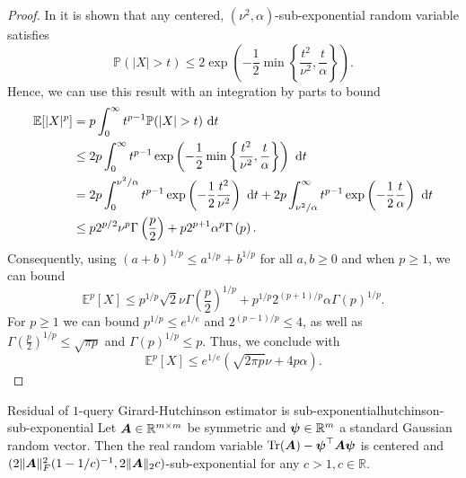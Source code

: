 \begin{proof}
    In \cite[Proposition 2.9]{wainwright-2019-highdimensional-statistics} it is shown that any centered, $(\nu^2, \alpha)$-sub-exponential random variable satisfies
    \begin{equation}
        \mathbb{P}(|X| > t) \leq 2 \exp\left(-\frac{1}{2}\min\left\{\frac{t^2}{\nu^2}, \frac{t}{\alpha}\right\}\right).
    \end{equation}
    Hence, we can use this result with an integration by parts to bound
    \begin{align}
        \mathbb{E}[|X|^p] 
        &= p \int_{0}^{\infty} t^{p-1} \mathbb{P}(|X| > t)~\mathrm{d}t \notag \\
        &\leq 2 p \int_{0}^{\infty} t^{p-1} \exp\left(-\frac{1}{2}\min\left\{\frac{t^2}{\nu^2}, \frac{t}{\alpha}\right\}\right)~\mathrm{d}t  \notag \\ 
        &= 2 p \int_{0}^{\nu^2 / \alpha} t^{p-1} \exp\left(-\frac{1}{2} \frac{t^2}{\nu^2} \right)~\mathrm{d}t + 2 p \int_{\nu^2 / \alpha}^{\infty} t^{p-1} \exp\left(-\frac{1}{2} \frac{t}{\alpha} \right)~\mathrm{d}t \notag \\
        &\leq p 2^{p/2} \nu^p \Gamma\left(\frac{p}{2}\right) + p 2^{p+1} \alpha^p \Gamma\left(p\right).
    \end{align}
    Consequently, using $(a + b)^{1/p} \leq a^{1/p} + b^{1/p}$ for all $a,b \geq 0$ and when $p \geq 1$, we can bound
    \begin{equation}
        \mathbb{E}^p[X] 
        \leq p^{1/p} \sqrt{2} \nu \Gamma\left(\frac{p}{2}\right)^{1/p} + p^{1/p} 2^{(p+1)/p} \alpha \Gamma\left(p\right)^{1/p}.
    \end{equation}
    For $p \geq 1$ we can bound $p^{1/p} \leq e^{1/e}$ and $2^{(p-1)/p} \leq 4$, as well as $\Gamma\left(\frac{p}{2}\right)^{1/p} \leq \sqrt{\pi p}$ and $\Gamma\left(p\right)^{1/p} \leq p$. Thus, we conclude with
    \begin{equation}
        \mathbb{E}^p[X] \leq e^{1/e} (\sqrt{2 \pi p} \nu + 4 p \alpha).
    \end{equation} 
\end{proof}

\begin{lemma}{Residual of $1$-query Girard-Hutchinson estimator is sub-exponential}{hutchinson-sub-exponential}
    Let $\boldsymbol{A} \in \mathbb{R}^{m \times m}$ be symmetric and $\boldsymbol{\psi} \in \mathbb{R}^m$ a standard Gaussian random vector. Then the real random variable $\operatorname{Tr}(\boldsymbol{A}) - \boldsymbol{\psi}^{\top} \boldsymbol{A} \boldsymbol{\psi}$ is centered and $(2 \lVert \boldsymbol{A} \rVert _F^2 (1 - 1/c)^{-1}, 2 \lVert \boldsymbol{A} \rVert _2 c )$-sub-exponential for any $c > 1, c \in \mathbb{R}$.
\end{lemma}

